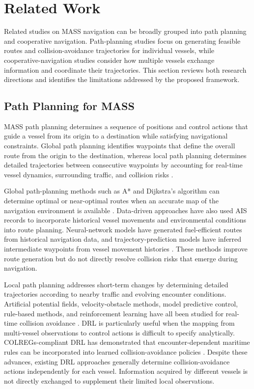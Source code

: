 \documentclass[final,5p,times,twocolumn]{elsarticle}
\begin{document}
\section{Related Work}
{\color{violet}
Related studies on MASS navigation can be broadly grouped into path planning and cooperative navigation. Path-planning studies focus on generating feasible routes and collision-avoidance trajectories for individual vessels, while cooperative-navigation studies consider how multiple vessels exchange information and coordinate their trajectories. This section reviews both research directions and identifies the limitations addressed by the proposed framework.

\subsection{Path Planning for MASS}
MASS path planning determines a sequence of positions and control actions that guide a vessel from its origin to a destination while satisfying navigational constraints. Global path planning identifies waypoints that define the overall route from the origin to the destination, whereas local path planning determines detailed trajectories between consecutive waypoints by accounting for real-time vessel dynamics, surrounding traffic, and collision risks \citep{Yuan}.

Global path-planning methods such as A* and Dijkstra's algorithm can determine optimal or near-optimal routes when an accurate map of the navigation environment is available \citep{58}. Data-driven approaches have also used AIS records to incorporate historical vessel movements and environmental conditions into route planning. Neural-network models have generated fuel-efficient routes from historical navigation data, and trajectory-prediction models have inferred intermediate waypoints from vessel movement histories \citep{119,120}. These methods improve route generation but do not directly resolve collision risks that emerge during navigation.

Local path planning addresses short-term changes by determining detailed trajectories according to nearby traffic and evolving encounter conditions. Artificial potential fields, velocity-obstacle methods, model predictive control, rule-based methods, and reinforcement learning have all been studied for real-time collision avoidance \citep{58,Sarhadi}. DRL is particularly useful when the mapping from multi-vessel observations to control actions is difficult to specify analytically. COLREGs-compliant DRL has demonstrated that encounter-dependent maritime rules can be incorporated into learned collision-avoidance policies \citep{Zhao-COLREGs}. Despite these advances, existing DRL approaches generally determine collision-avoidance actions independently for each vessel. Information acquired by different vessels is not directly exchanged to supplement their limited local observations.

}
\end{document}
